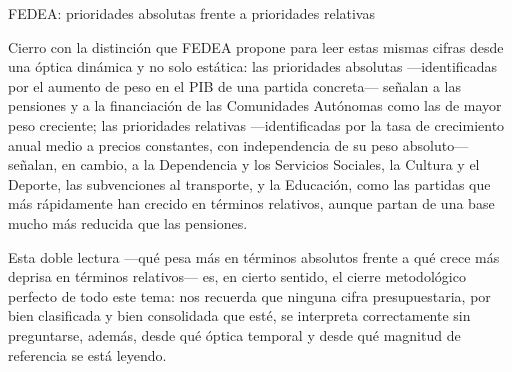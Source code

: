 \documentclass[10pt,a4paper]{article}
\begin{document}
FEDEA: prioridades absolutas frente a prioridades relativas

Cierro con la distinción que FEDEA propone para leer estas mismas cifras desde una óptica dinámica y no solo estática: las prioridades absolutas —identificadas por el aumento de peso en el PIB de una partida concreta— señalan a las pensiones y a la financiación de las Comunidades Autónomas como las de mayor peso creciente; las prioridades relativas —identificadas por la tasa de crecimiento anual medio a precios constantes, con independencia de su peso absoluto— señalan, en cambio, a la Dependencia y los Servicios Sociales, la Cultura y el Deporte, las subvenciones al transporte, y la Educación, como las partidas que más rápidamente han crecido en términos relativos, aunque partan de una base mucho más reducida que las pensiones.

Esta doble lectura —qué pesa más en términos absolutos frente a qué crece más deprisa en términos relativos— es, en cierto sentido, el cierre metodológico perfecto de todo este tema: nos recuerda que ninguna cifra presupuestaria, por bien clasificada y bien consolidada que esté, se interpreta correctamente sin preguntarse, además, desde qué óptica temporal y desde qué magnitud de referencia se está leyendo.
\end{document}
